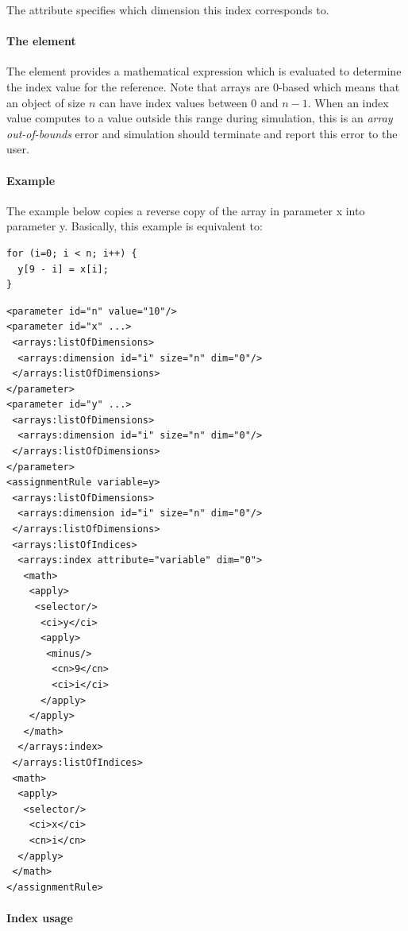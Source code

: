 The  attribute specifies which dimension this index corresponds to.

\paragraph{The  element}

The  element provides a mathematical expression which is evaluated to determine the index value for the reference.  Note that arrays are 0-based which means that an object of size $n$ can have index values between 0 and $n-1$.  When an index value computes to a value outside this range during simulation, this is an \emph{array out-of-bounds} error and simulation should terminate and report this error to the user.

\paragraph{Example}

The example below copies a reverse copy of the array in parameter x into parameter y.  Basically, this example is equivalent to:
\begin{verbatim}
for (i=0; i < n; i++) {
  y[9 - i] = x[i];
}
\end{verbatim}

\begin{verbatim} 
<parameter id="n" value="10"/>
<parameter id="x" ...>
 <arrays:listOfDimensions>
  <arrays:dimension id="i" size="n" dim="0"/>
 </arrays:listOfDimensions>
</parameter>
<parameter id="y" ...>
 <arrays:listOfDimensions>
  <arrays:dimension id="i" size="n" dim="0"/>
 </arrays:listOfDimensions>
</parameter>
<assignmentRule variable=y>
 <arrays:listOfDimensions>
  <arrays:dimension id="i" size="n" dim="0"/>
 </arrays:listOfDimensions>
 <arrays:listOfIndices>
  <arrays:index attribute="variable" dim="0">
   <math>
    <apply>
     <selector/>
      <ci>y</ci>
      <apply>
       <minus/>
        <cn>9</cn>
        <ci>i</ci>
      </apply>
    </apply>
   </math>
  </arrays:index>
 </arrays:listOfIndices>
 <math>
  <apply>
   <selector/>
    <ci>x</ci>
    <cn>i</cn>
  </apply>
 </math> 
</assignmentRule>
\end{verbatim}

\paragraph{Index usage}

